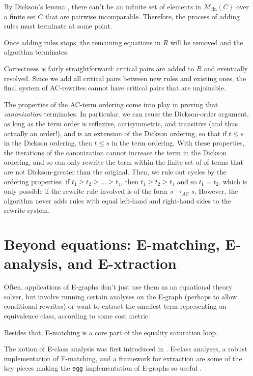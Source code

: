 \documentclass[12pt,a4paper,twoside,openright]{report}
\numberwithin{equation}{chapter}		%
\numberwithin{figure}{chapter}			%
\numberwithin{table}{chapter}			%
\theoremstyle{definition}
\theoremstyle{plain}
\begin{document}
By Dickson's lemma \cites{goos_congruence_2000}, there can't be an infinite set of elements in $\mathcal{M}_\textrm{fin}(C)$ over a finite set $C$ that are pairwise incomparable. Therefore, the process of adding rules must terminate at some point.

Once adding rules stops, the remaining equations in $R$ will be removed and the algorithm terminates.

Correctness is fairly straightforward: critical pairs are added to $R$ and eventually resolved. Since we add all critical pairs between new rules and existing ones, the final system of AC-rewrites cannot have critical pairs that are unjoinable.

The properties of the AC-term ordering come into play in proving that \emph{canonization} terminates. In particular, we can reuse the Dickson-order argument, as long as the term order is reflexive, antisymmetric, and transitive (and thus actually an order!), and is an extension of the Dickson ordering, so that if $t \le s$ in the Dickson ordering, then $t \le s$ in the term ordering. With these properties, the iterations of the canonization cannot increase the term in the Dickson ordering, and so can only rewrite the term within the finite set of of terms that are not Dickson-greater than the original. Then, we rule out cycles by the ordering properties: if $t_1 \ge t_2 \ge \ldots \ge t_1$, then $t_1 \ge t_2 \ge t_1$ and so $t_1 = t_2$, which is only possible if the rewrite rule involved is of the form $s \rightarrow_{AC} s$. However, the algorithm never adds rules with equal left-hand and right-hand sides to the rewrite system.

\chapter{Beyond equations: E-matching, E-analysis, and E-xtraction}
Often, applications of E-graphs don't just use them as an equational theory solver, but involve running certain analyses on the E-graph (perhaps to allow conditional rewrites) or want to extract the smallest term representing an equivalence class, according to some cost metric.

Besides that, E-matching is a core part of the equality saturation loop.

The notion of E-class analysis was first introduced in \cite[Section~4.1]{willsey_egg_2021}. E-class analyses, a robust implementation of E-matching, and a framework for extraction are some of the key pieces making the \texttt{egg} implementation of E-graphs so useful \cite{willsey_egg_2021}.
\end{document}
